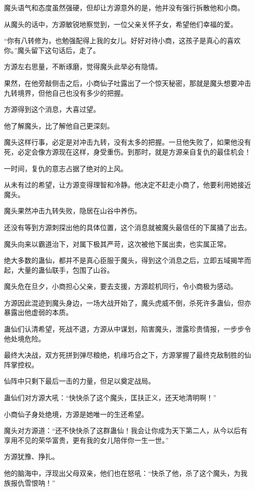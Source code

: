 \begin{this_body}
魔头语气和态度虽然强硬，但却让方源意外的是，他并没有强行拆散他和小商。

从魔头的话中，方源敏锐地察觉到，一位父亲关怀子女，希望他们幸福的爱。

“你有八转修为，也勉强配得上我的女儿。好好对待小商，这孩子是真心的喜欢你。”魔头留下这句话后，走了。

方源左右思量，不断琢磨，觉得魔头此举必有隐情。

果然，在他旁敲侧击之后，小商仙子吐露出了一个惊天秘密，那就是魔头想要冲击九转境界，但他自己也没有多少的把握。

方源得到这个消息，大喜过望。

他了解魔头，比了解他自己更深刻。

魔头这样行事，必定是对冲击九转，没有太多的把握。一旦他失败了，如果他没有死，必定会像方源现在这样，身受重伤。到那时，就是方源亲自复仇的最佳机会！

一时间，复仇的意志占据了绝对的上风。

从未有过的希望，让方源变得理智和冷静。他决定不赶走小商了，他要利用她接近魔头。

魔头果然冲击九转失败，隐居在山谷中养伤。

还没有等到方源刺探出他的具体位置，这个消息就被魔头最信任的下属捅了出去。

魔头向来以霸道治下，对属下极其严苛，这次被他下属出卖，也实属正常。

绝大多数的蛊仙，都并不是真心臣服于魔头，得到这个消息之后，立即五域揭竿而起，大量的蛊仙联手，包围了山谷。

魔头危在旦夕，小商担心父亲，要去支援，方源趁机同行，令小商极为感动。

方源因此混迹到魔头身边，一场大战开始了，魔头虎威不倒，杀死许多蛊仙，但亦暴露出他虚弱的本质。

蛊仙们认清希望，死战不退，方源从中谋划，陷害魔头，泄露珍贵情报，一步步令他处境危险。

最终大决战，双方死拼到弹尽粮绝，机缘巧合之下，方源掌握了最终克敌制胜的仙阵掌控权。

仙阵中只剩下最后一击的力量，但足以奠定战局。

蛊仙们对方源大吼：“快快杀了这个魔头，匡扶正义，还天地清明啊！”

小商仙子身处绝境，方源是她唯一的生还希望。

魔头对方源道：“还不快快杀了这群蛊仙！我会让你成为天下第二人，从今以后有享用不见的荣华富贵，更有我的女儿陪伴你一生一世。”

方源犹豫、挣扎。

他的脑海中，浮现出父母双亲，他们也在怒吼：“快杀了他，杀了这个魔头，为我族报仇雪恨呐！”


\end{this_body}
